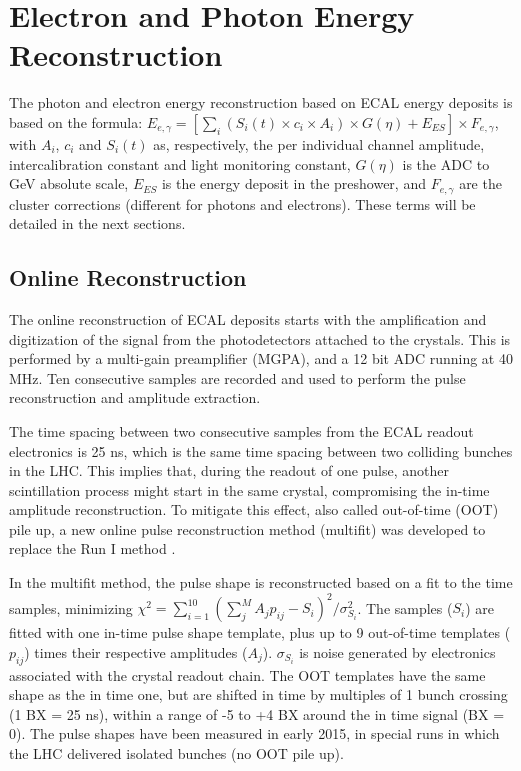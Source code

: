 \section{Electron and Photon Energy Reconstruction}

The photon and electron energy reconstruction based on ECAL energy deposits is based on the formula: $E_{e,\gamma} = \left[ \sum_{i}\left( S_i(t)\times c_{i} \times A_{i}\right)\times G(\eta) + E_{ES} \right]\times F_{e,\gamma}$, with $A_{i}$, $c_i$ and $S_i(t)$ as, respectively, the per individual channel amplitude, intercalibration constant and light monitoring constant, $G(\eta)$ is the ADC to GeV absolute scale, $E_{ES}$ is the energy deposit in the preshower, and $F_{e,\gamma}$ are the cluster corrections (different for photons and electrons). These terms will be detailed in the next sections.

\subsection{Online Reconstruction}

The online reconstruction of ECAL deposits starts with the amplification and digitization of the signal from the photodetectors attached to the crystals. This is performed by a multi-gain preamplifier (MGPA), and a 12 bit ADC running at 40 MHz. Ten consecutive samples are recorded and used to perform the pulse reconstruction and amplitude extraction.

The time spacing between two consecutive samples from the ECAL readout electronics is 25 ns, which is the same time spacing between two colliding bunches in the LHC. This implies that, during the readout of one pulse, another scintillation process might start in the same crystal, compromising the in-time amplitude reconstruction. To mitigate this effect, also called out-of-time (OOT) pile up, a new online pulse reconstruction method (multifit) was developed to replace the Run I method \cite{weights}.

In the multifit method, the pulse shape is reconstructed based on a fit to the time samples, minimizing $\chi^2 = \sum_{i=1}^{10}{\left( \sum_j^MA_jp_{ij} - S_i \right)^2}/{\sigma^2_{S_i}}$. The samples ($S_i$) are fitted with one in-time pulse shape template, plus up to 9  out-of-time templates ($p_{ij}$) times their respective amplitudes ($A_j$). $\sigma_{S_i}$ is noise generated by electronics associated with the crystal readout chain. The OOT templates have the same shape as the in time one, but are shifted in time by multiples of 1 bunch crossing (1 BX = 25 ns), within a range of -5 to +4 BX around the in time signal (BX = 0). The pulse shapes have been measured in early 2015, in special runs in which the LHC delivered isolated bunches (no OOT pile up).

